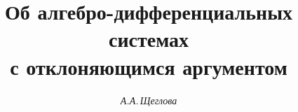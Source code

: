 









\newcommand{\const}{\operatorname{const}}


\newcommand{\rank}{\operatorname{rank}}


\newcommand{\diag}{\operatorname{diag}}


\newcommand{\A}{\cal A}


\newcommand{\col}{\operatorname{col}}


\newcommand{\vraisup}{\operatornamewithlimits{vrai~sup}}


\newcommand{\tts}[1]{}







\setcounter{page}{65}















\author{\it А.А.\,Щеглова}




\title{Об алгебро-дифференциальных системах\\ с отклоняющимся аргументом}





\date{}




\pagestyle{plain} %





